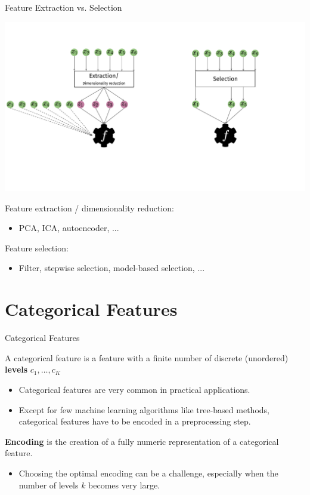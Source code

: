 \begin{vbframe}{Feature Extraction vs. Selection}
  \begin{center}
    \includegraphics[width=\textwidth, trim=1cm 3cm 2cm 2cm]{figure_man/feat_extr_vs_selection.pdf}
  \end{center}
  
  Feature extraction / dimensionality reduction:
  \begin{itemize}
    \item PCA, ICA, autoencoder, ...
  \end{itemize}
  
  Feature selection:
  
  \begin{itemize}
    \item Filter, stepwise selection, model-based selection, ...
  \end{itemize}
\end{vbframe}


\section{Categorical Features}
\begin{vbframe}{Categorical Features}
  
  A categorical feature is a feature with a finite number of discrete (unordered) \textbf{levels} $c_1, \dots, c_K$%
  
  \begin{itemize}
    \item Categorical features are very common in practical applications.
          
    \item Except for few machine learning algorithms like tree-based methods, categorical features have to be encoded in a preprocessing step.
  \end{itemize}
  \medskip
  
  \textbf{Encoding} is the creation of a fully numeric representation of a categorical feature.
  \begin{itemize}
    \item Choosing the optimal encoding can be a challenge, especially when the number of levels $k$ becomes very large.
  \end{itemize}
\end{vbframe}

